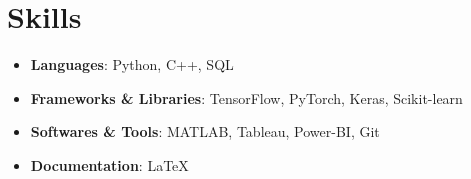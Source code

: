 \documentclass[letterpaper,11pt]{article}
\newcommand{\resumeItem}[2]{
  \item\small{
    \textbf{#1}{: #2 \vspace{-3pt}}
  }
}
\newcommand{\resumeSubItem}[2]{\resumeItem{#1}{#2}\vspace{-5pt}}
\newcommand{\resumeSubHeadingListStart}{\begin{itemize}[leftmargin=*]}
\newcommand{\resumeSubHeadingListEnd}{\end{itemize}\vspace{-16pt}}
\begin{document}
%


\section{Skills}
 \resumeSubHeadingListStart
    \resumeSubItem{Languages}{Python, C++, SQL}
    \resumeSubItem{Frameworks \& Libraries}{TensorFlow, PyTorch, Keras, Scikit-learn}
    \resumeSubItem{Softwares \& Tools}{MATLAB, Tableau, Power-BI, Git}
    \resumeSubItem{Documentation}{\LaTeX}
 \resumeSubHeadingListEnd





\end{document}
